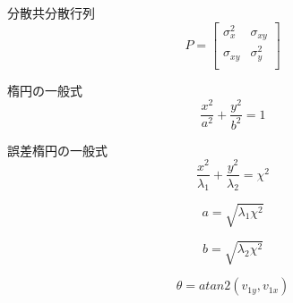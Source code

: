 \documentclass{jarticle}
\begin{document}
分散共分散行列
\[
  P = \left[
    \begin{array}{rrr}
      \sigma_{x}^2 & \sigma_{xy} \\
      \sigma_{xy} & \sigma_{y}^2 \\
      \end{array}
  \right]
\]

楕円の一般式
$$
\frac{x^2}{a^2} + \frac{y^2}{b^2} = 1
$$

誤差楕円の一般式
$$
\frac{x^2}{\lambda_1} + \frac{y^2}{\lambda_2} = \chi^2
$$

$$
a = \sqrt{\lambda_1 \chi^2}
$$

$$
b = \sqrt{\lambda_2 \chi^2}
$$

$$
\theta = atan2(v_{1y}, v_{1x})
$$
\end{document}
